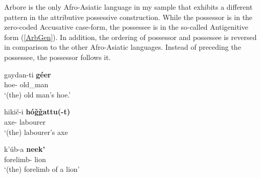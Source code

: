 {Arbore} is the only Afro-Asiatic language in my sample that exhibits a different pattern in the attributive possessive construction.
While the possessor is in the zero-coded Accusative case-form, the possessee is in the so-called Antigenitive form (\ref{ArbGen}).
In addition, the ordering of possessor and possessee is reversed in comparison to the other Afro-Asiatic languages. 
Instead of preceding the possessee, the possessor follows it.

 
\begin{exe}\ex\label{ArbGen}
\begin{xlist}
\ex\gll gaydan-ti \textbf{g\'eer}\\
 hoe-\antgen{} old\_man\\
\glt  `(the) old man's hoe.'
 

\ex\gll hiki\v c-i \textbf{h\'o\v g\v gattu(-t)}\\
axe-\antgen{} labourer\\
\glt `(the) labourer's axe

\ex\gll k'\'ub-a \textbf{neek'}\\
forelimb-\antgen{}  lion\\
\glt `(the) forelimb of a lion'
\end{xlist}
\end{exe}




